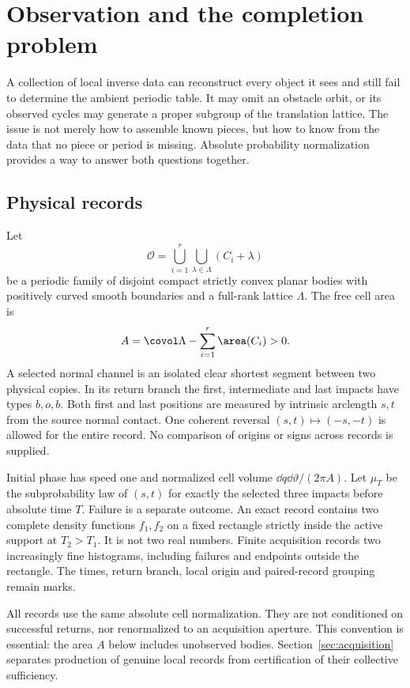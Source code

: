 \section{Observation and the completion problem}\label{sec:setting}
A collection of local inverse data can reconstruct every object it sees
and still fail to determine the ambient periodic table. It may omit an
obstacle orbit, or its observed cycles may generate a proper subgroup
of the translation lattice. The issue is not merely how to assemble
known pieces, but how to know from the data that no piece or period is
missing. Absolute probability normalization provides a way to answer
both questions together.

\subsection{Physical records}
Let
\[
 \mathcal O=\bigcup_{i=1}^r\bigcup_{\lambda\in\Lambda}(C_i+\lambda)
\]
be a periodic family of disjoint compact strictly convex planar bodies
with positively curved smooth boundaries and a full-rank lattice
$\Lambda$. The free cell area is
\begin{equation}\label{eq:area-budget}
 A=\covol\Lambda-\sum_{i=1}^r\area(C_i)>0.
\end{equation}
A selected normal channel is an isolated clear shortest segment between
two physical copies. In its return branch the first, intermediate and
last impacts have types $b,o,b$. Both first and last positions are
measured by intrinsic arclength $s,t$ from the source normal contact.
One coherent reversal $(s,t)\mapsto(-s,-t)$ is allowed for the entire
record. No comparison of origins or signs across records is supplied.

Initial phase has speed one and normalized cell volume
$\dd q\dd\vartheta/(2\pi A)$. Let $\mu_T$ be the subprobability law
of $(s,t)$ for exactly the selected three impacts before absolute time
$T$. Failure is a separate outcome. An exact record contains two
complete density functions $f_1,f_2$ on a fixed rectangle strictly
inside the active support at $T_2>T_1$. It is not two real numbers.
Finite acquisition records two increasingly fine histograms, including
failures and endpoints outside the rectangle. The times, return branch,
local origin and paired-record grouping remain marks.

All records use the same absolute cell normalization. They are not
conditioned on successful returns, nor renormalized to an acquisition
aperture. This convention is essential: the area $A$ below includes
unobserved bodies. Section~\ref{sec:acquisition} separates production
of genuine local records from certification of their collective sufficiency.

